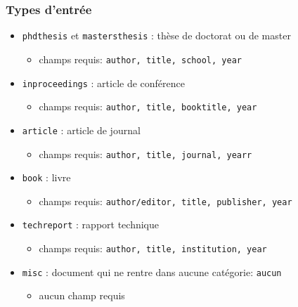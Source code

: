 \documentclass{beamer}
\begin{document}
\begin{frame}[fragile]
  \frametitle{Types d'entrée}

\begin{itemize}
  \item \texttt{phdthesis} et \texttt{mastersthesis} : thèse de doctorat ou de master
    \begin{itemize}
      \item champs requis: \texttt{author, title, school, year}
    \end{itemize}
  \item \texttt{inproceedings} : article de conférence
    \begin{itemize}
      \item champs requis: \texttt{author, title, booktitle, year} 
    \end{itemize}
  \item \texttt{article} : article de journal
    \begin{itemize}
      \item champs requis: \texttt{author, title, journal, yearr} 
    \end{itemize}
  \item \texttt{book} : livre
    \begin{itemize}
      \item champs requis: \texttt{author/editor, title, publisher, year} 
    \end{itemize}
  \item \texttt{techreport} : rapport technique
    \begin{itemize}
      \item champs requis: \texttt{author, title, institution, year}
    \end{itemize}
  \item \texttt{misc} : document qui ne rentre dans aucune catégorie: \texttt{aucun} 
    \begin{itemize}
      \item aucun champ requis
    \end{itemize}
\end{itemize}

\end{frame}


\end{document}
